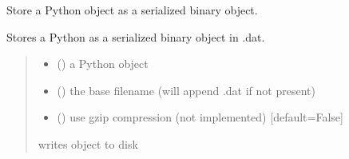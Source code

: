 \documentclass[letterpaper,12pt,english]{sphinxmanual}
\begin{document}
\begin{fulllineitems}
\label{\detokenize{api/core:cbmpy.CBTools.storeObj}}
\pysigstartsignatures
\pysiglinewithargsret
{}
{\sphinxparamcomma {}\sphinxparamcomma {}}
{}
\pysigstopsignatures
\sphinxAtStartPar
Store a Python object as a serialized binary object.

\sphinxAtStartPar
Stores a Python  as a serialized binary object in .dat.
\begin{quote}\begin{description}
\begin{itemize}
\item {} 
\sphinxAtStartPar
{} () \textendash{} a Python object

\item {} 
\sphinxAtStartPar
{} () \textendash{} the base filename (will append .dat if not present)

\item {} 
\sphinxAtStartPar
{} (\sphinxstyleliteralemphasis{\sphinxupquote{, }}) \textendash{} use gzip compression (not implemented) {[}default=False{]}

\end{itemize}

\sphinxAtStartPar
{} \textendash{} writes object to disk

\end{description}\end{quote}

\end{fulllineitems}

\end{document}
